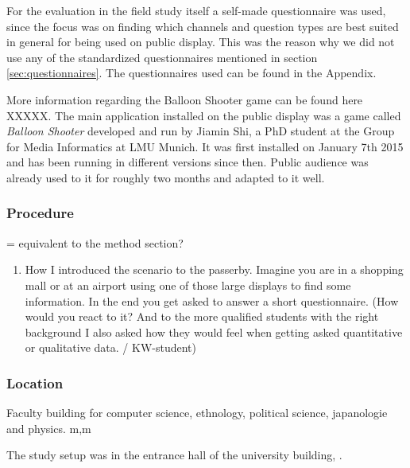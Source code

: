 		For the evaluation in the field study itself a self-made questionnaire was used, since the focus was on finding which channels and question types are best suited in general for being used on public display. This was the reason why we did not use any of the standardized questionnaires mentioned in section \ref{sec:questionnaires}. The questionnaires used can be found in the Appendix.



		More information regarding the Balloon Shooter game can be found here XXXXX. 
		The main application installed on the public display was a game called \textit{Balloon Shooter} developed and run by Jiamin Shi, a PhD student at the Group for Media Informatics at LMU Munich. It was first installed on January 7th 2015 and has been running in different versions since then. Public audience was already used to it for roughly two months and adapted to it well.





	\subsubsection{Procedure}
		= equivalent to the method section?



		\begin{enumerate}
		\item How I introduced the scenario to the passerby. Imagine you are in a shopping mall or at an airport using one of those large displays to find some information. In the end you get asked to answer a short questionnaire. (How would you react to it? And to the more qualified students with the right background I also asked how they would feel when getting asked quantitative or qualitative data. / KW-student) 
		\end{enumerate}


	\subsubsection{Location}

	Faculty building for computer science, ethnology, political science, japanologie and physics. m,m

	The study setup was in the entrance hall of the university building, .

